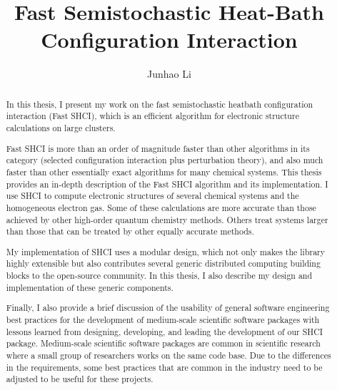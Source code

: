 \documentclass[phd,tocprelim]{cornell}
\title {Fast Semistochastic Heat-Bath Configuration Interaction}
\author {Junhao Li}
\begin{document}
\maketitle
\makecopyright

\begin{abstract}
In this thesis, I present my work on the fast semistochastic heatbath configuration interaction (Fast SHCI), which is an efficient algorithm for electronic structure calculations on large clusters.

Fast SHCI is more than an order of magnitude faster than other algorithms in its category (selected configuration interaction plus perturbation theory), and also much faster than other essentially exact algorithms for many chemical systems.
This thesis provides an in-depth description of the Fast SHCI algorithm and its implementation. I use SHCI to compute electronic structures of several chemical systems and the homogeneous electron gas.
Some of these calculations are more accurate than those achieved by other high-order quantum chemistry methods.  Others treat systems larger than those that can be treated by other equally accurate methods.

My implementation of SHCI uses a modular design, which not only makes the library highly extensible but also contributes several generic distributed computing building blocks to the open-source community. 
In this thesis, I also describe my design and implementation of these generic components.

Finally, I also provide a brief discussion of the usability of general software engineering best practices for the development of medium-scale scientific software packages with lessons learned from designing, developing, and leading the development of our SHCI package.
Medium-scale scientific software packages are common in scientific research where a small group of researchers works on the same code base.
Due to the differences in the requirements, some best practices that are common in the industry need to be adjusted to be useful for these projects.

\end{abstract}
\end{document}

